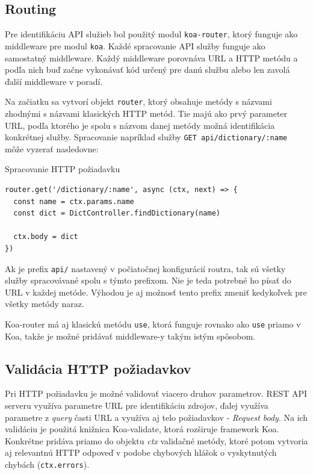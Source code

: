 \documentclass[
  digital, %
  table,   %
  lof,     %
  lot,     %
]{fithesis3}
\begin{document}
\subsection{Routing}
Pre identifikáciu API služieb bol použitý modul \texttt{koa-router}, ktorý funguje ako middleware pre modul \texttt{koa}. Každé spracovanie API služby funguje ako samostatný middleware. Každý middleware porovnáva URL a HTTP metódu a podľa nich buď začne vykonávať kód určený pre danú službu alebo len zavolá ďalší middleware v poradí.

Na začiatku sa vytvorí objekt \texttt{router}, ktorý obsahuje metódy s názvami zhodnými s názvami klasických HTTP metód. Tie majú ako prvý parameter URL, podľa ktorého je spolu s názvom danej metódy možná identifikácia konkrétnej služby. Spracovanie napríklad služby \texttt{GET api/dictionary/:name} môže vyzerať nasledovne:

\begin{exmp}
Spracovanie HTTP požiadavku
\centering
\begin{lstlisting}[basicstyle=\small]
router.get('/dictionary/:name', async (ctx, next) => {
  const name = ctx.params.name
  const dict = DictController.findDictionary(name)
  
  ctx.body = dict
})
\end{lstlisting}
\end{exmp}

Ak je prefix \texttt{api/} nastavený v počiatočnej konfigurácií routra, tak sú všetky služby spracovávané spolu s týmto prefixom. Nie je teda potrebné ho písať do URL v každej metóde. Výhodou je aj možnosť tento prefix zmeniť kedykoľvek pre všetky metódy naraz.

Koa-router má aj klasickú metódu \texttt{use}, ktorá funguje rovnako ako \texttt{use} priamo v Koa, takže je možné pridávať middleware-y takým istým spôsobom.

\subsection{Validácia HTTP požiadavkov}
Pri HTTP požiadavku je možné validovať viacero druhov parametrov. REST API serveru využíva parametre URL pre identifikáciu zdrojov, ďalej využíva parametre z \textit{query} časti URL a využíva aj telo požiadavkov - \textit{Request body}. Na ich validáciu je použitá knižnica Koa-validate, ktorá rozširuje framework Koa. Konkrétne pridáva priamo do objektu \textit{ctx} validačné metódy, ktoré potom vytvoria aj relevantnú HTTP odpoveď v podobe chybových hlášok o vyskytnutých chybách (\texttt{ctx.errors}).
\end{document}
